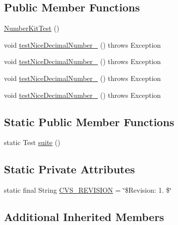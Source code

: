 \subsection*{Public Member Functions}
\begin{DoxyCompactItemize}
\item 
\hyperlink{classorg_1_1jgap_1_1util_1_1_number_kit_test_aeaa9f8d1d93ac76712a6cb7483d9510b}{Number\-Kit\-Test} ()
\item 
void \hyperlink{classorg_1_1jgap_1_1util_1_1_number_kit_test_a1b68aa7e58cef0016f48dc2208b4db38}{test\-Nice\-Decimal\-Number\-\_} ()  throws Exception 
\item 
void \hyperlink{classorg_1_1jgap_1_1util_1_1_number_kit_test_ad4d7ce4762d11b011e708734f882cc8e}{test\-Nice\-Decimal\-Number\-\_} ()  throws Exception 
\item 
void \hyperlink{classorg_1_1jgap_1_1util_1_1_number_kit_test_a44eb3b33bffb8977e7b58476301c4b78}{test\-Nice\-Decimal\-Number\-\_} ()  throws Exception 
\item 
void \hyperlink{classorg_1_1jgap_1_1util_1_1_number_kit_test_a68ae439d0b2ed2db19df2f41fbb1b2e2}{test\-Nice\-Decimal\-Number\-\_} ()  throws Exception 
\end{DoxyCompactItemize}
\subsection*{Static Public Member Functions}
\begin{DoxyCompactItemize}
\item 
static Test \hyperlink{classorg_1_1jgap_1_1util_1_1_number_kit_test_a0a1f742b4e20fd8d26a7436034b123f0}{suite} ()
\end{DoxyCompactItemize}
\subsection*{Static Private Attributes}
\begin{DoxyCompactItemize}
\item 
static final String \hyperlink{classorg_1_1jgap_1_1util_1_1_number_kit_test_aaed0b4818558079bf6844cbe32ecd9b3}{C\-V\-S\-\_\-\-R\-E\-V\-I\-S\-I\-O\-N} = \char`\"{}\$Revision\-: 1. \$\char`\"{}
\end{DoxyCompactItemize}
\subsection*{Additional Inherited Members}


